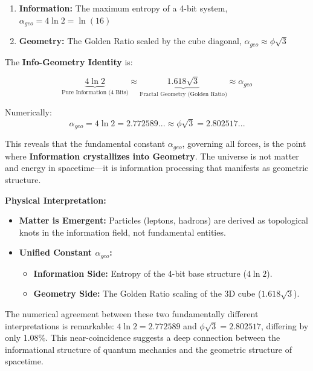\documentclass[11pt, a4paper]{article}
\begin{document}
\begin{enumerate}
    \item \textbf{Information:} The maximum entropy of a 4-bit system, $\alpha_{geo} = 4\ln 2 = \ln(16)$
    \item \textbf{Geometry:} The Golden Ratio scaled by the cube diagonal, $\alpha_{geo} \approx \phi\sqrt{3}$
\end{enumerate}

The \textbf{Info-Geometry Identity} is:

\begin{equation}
\underbrace{4 \ln 2}_{\text{Pure Information (4 Bits)}} \approx \underbrace{1.618 \sqrt{3}}_{\text{Fractal Geometry (Golden Ratio)}} \approx \alpha_{geo}
\label{eq:identity_visual}
\end{equation}

Numerically:
\begin{equation}
\alpha_{geo} = 4\ln 2 = 2.772589... \approx \phi\sqrt{3} = 2.802517...
\label{eq:identity}
\end{equation}

This reveals that the fundamental constant $\alpha_{geo}$, governing all forces, is the point where \textbf{Information crystallizes into Geometry}. The universe is not matter and energy in spacetime—it is information processing that manifests as geometric structure.

\textbf{Physical Interpretation:}
\begin{itemize}
    \item \textbf{Matter is Emergent:} Particles (leptons, hadrons) are derived as topological knots in the information field, not fundamental entities.
    \item \textbf{Unified Constant $\alpha_{geo}$:}
    \begin{itemize}
        \item \textbf{Information Side:} Entropy of the 4-bit base structure ($4 \ln 2$).
        \item \textbf{Geometry Side:} The Golden Ratio scaling of the 3D cube ($1.618 \sqrt{3}$).
    \end{itemize}
\end{itemize}

The numerical agreement between these two fundamentally different interpretations is remarkable: $4\ln 2 = 2.772589$ and $\phi\sqrt{3} = 2.802517$, differing by only 1.08\%. This near-coincidence suggests a deep connection between the informational structure of quantum mechanics and the geometric structure of spacetime.
\end{document}
